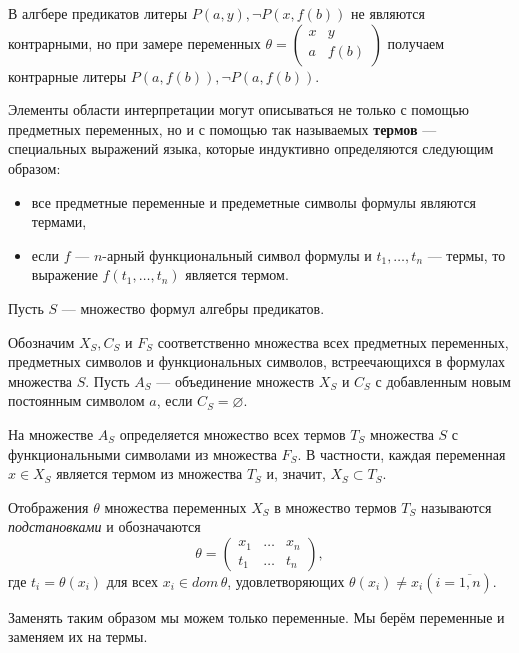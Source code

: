 В алгбере предикатов литеры $P(a, y), \neg P(x,f(b))$ не являются контрарными, но при замере переменных $\theta = \left(\begin{matrix}x & y \\ a & f(b)\end{matrix}\right)$ получаем контрарные литеры $P(a, f(b)), \lnot P(a, f(b))$.

\dftion Элементы области интерпретации могут описываться не только с помощью предметных переменных, но и с помощью так называемых \textbf{термов} --- специальных выражений языка, которые индуктивно определяются следующим образом:
\begin{itemize}
    \item все предметные переменные и предеметные символы формулы являются термами,
    \item если $f$ --- $n$-арный функциональный символ формулы и $t_1,\dots,t_n$ --- термы, то выражение $f(t_1,\dots,t_n)$ является термом.
\end{itemize}

Пусть $S$ --- множество формул алгебры предикатов.

Обозначим $X_S, C_S$ и $F_S$ соответственно множества всех предметных переменных, предметных символов и функциональных символов, встреечающихся в формулах множества $S$. Пусть $A_S$ --- объединение множеств $X_S$ и $C_S$ с добавленным новым постоянным символом $a$, если $C_S = \varnothing$.

На множестве $A_S$ определяется множество всех термов $T_S$ множества $S$ с функциональными символами из множества $F_S$. В частности, каждая переменная $x \in X_S$ является термом из множества $T_S$ и, значит, $X_S \subset T_S$.

Отображения $\theta$ множества переменных $X_S$ в множество термов $T_S$ называются {\it подстановками} и обозначаются
\begin{equation*}
    \theta = \left(\begin{matrix}
        x_1 & \dots & x_n \\ t_1 & \dots & t_n
    \end{matrix}\right),
\end{equation*}
где $t_i = \theta(x_i)$ для всех $x_i \in dom\, \theta$, удовлетворяющих $\theta(x_i) \neq x_i (i = \overline{1,n})$.

Заменять таким образом мы можем только переменные. Мы берём переменные и заменяем их на термы.